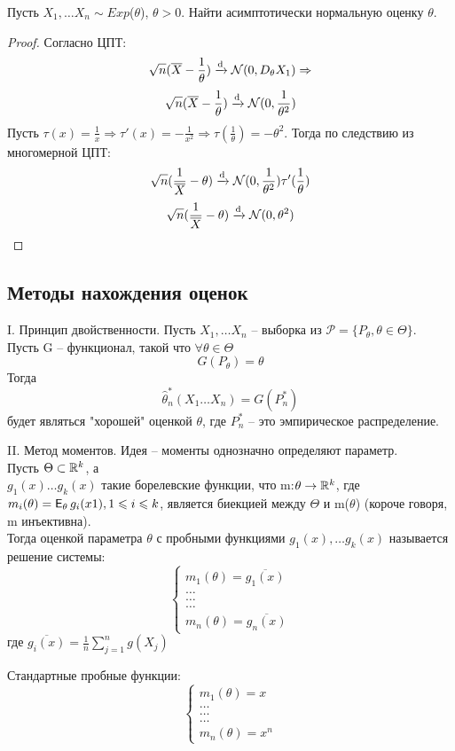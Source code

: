 \begin{example}
Пусть $X_1, \ldots X_n \sim Exp$($\theta$), $\theta > 0$. Найти асимптотически нормальную оценку $\theta$.
\end{example}

\begin{proof}
Согласно ЦПТ:
$$
\sqrt{n}(\overline{X} - \frac{1}{\theta}) \xrightarrow{\mathrm{d}} \mathcal{N}(0, D_{\theta}X_1) \Rightarrow
$$
$$
\sqrt{n}(\overline{X} - \frac{1}{\theta}) \xrightarrow{\mathrm{d}} \mathcal{N}(0, \frac{1}{\theta^2})
$$
Пусть $\tau(x) = \frac{1}{x} \Rightarrow \tau'(x) = -\frac{1}{x^2} \Rightarrow \tau(\frac{1}{\theta}) = -\theta^2$. Тогда по следствию из многомерной ЦПТ:
$$
\sqrt{n}(\frac{1}{\overline{X}} - \theta) \xrightarrow{\mathrm{d}} \mathcal{N}(0, \frac{1}{\theta^2})\tau'(\frac{1}{\theta})
$$
$$
\sqrt{n}(\frac{1}{\overline{X}} - \theta) \xrightarrow{\mathrm{d}} \mathcal{N}(0, \theta^2)
$$

\end{proof}

\subsection{Методы нахождения оценок}

I. Принцип двойственности.
Пусть $X_1, \ldots X_n$ -- выборка из $\mathcal P = \{P_{\theta}, \theta \in \Theta\}$.\\
Пусть G -- функционал, такой что $\forall \theta \in \Theta$
$$
G(P_{\theta}) = \theta
$$
Тогда 
$$
\hat\theta^{*}_n(X_1 \ldots X_n) = G(P^{*}_n)
$$
будет являться "хорошей" оценкой $\theta$, где $P^{*}_n$ -- это эмпирическое распределение.

II. Метод моментов.
Идея -- моменты однозначно определяют параметр.\\
Пусть $\Theta \subset \mathbb{R}^k$, а \\
$g_1(x) \ldots g_k(x)$ такие борелевские функции, что m:$\theta \to \mathbb{R}^k$, где $m_i(\theta) = \E_{\theta} g_i(x1), 1 \leq i \leq k$, является биекцией между $\Theta$ и m($\theta$) (короче говоря, m инъективна).\\
Тогда оценкой параметра $\theta$ с пробными функциями $g_1(x), \ldots g_k(x)$ называется решение системы: \\
$$
\begin{cases}
m_1(\theta) = \overline{g_1(x)} \\
\ldots \\
\ldots \\
\ldots \\
m_n(\theta) = \overline{g_n(x)} 
\end{cases} 
$$
где $\overline{g_i(x)} = \frac{1}{n}\sum_{j = 1}^{n}g(X_j)$
\begin{remark}
Стандартные пробные функции:
$$
\begin{cases}
m_1(\theta) = x \\
\ldots \\
\ldots \\
\ldots \\
m_n(\theta) = x^n 
\end{cases} 
$$
\end{remark}

